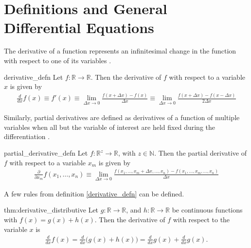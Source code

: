 
\section{Definitions and General Differential Equations}
 The derivative of a function represents an infinitesimal change in the function with respect to one of its variables \cite{bib:Wolfram}. 
\begin{defn}[Derivative]{derivative_defn} 
	Let $f:\mathbb{R}\rightarrow\mathbb{R}$. Then the derivative of $f$ with respect to a variable $x$ is given by
	\begin{align*}
	\frac{d}{dx}f(x)\equiv f'(x) \equiv\lim\limits_{\Delta x \rightarrow 0}\frac{f(x+\Delta x)-f(x)}{\Delta x} \equiv \lim\limits_{\Delta x \rightarrow 0}\frac{f(x+\Delta x)-f(x-\Delta x)}{2\Delta x}
	\end{align*}
\end{defn}
Similarly, partial derivatives are defined as derivatives of a function of multiple variables when all but the variable of interest are held fixed during the differentiation \cite{bib:Wolfram}. 
\begin{defn}{partial_derivative_defn}
	Let $f:\mathbb{R}^z\rightarrow\mathbb{R}$, with $z \in \mathbb{N}$. Then the partial derivative of $f$ with respect to a variable $x_m$ is given by
	\begin{align*}
	\frac{\partial}{\partial x_m}f(x_1,\dots,x_n) \equiv \lim\limits_{\Delta x \rightarrow 0}\frac{f(x_1,\dots,x_m+\Delta x, \dots,x_n)-f(x_1,\dots,x_m,\dots,x_n)}{\Delta x}
	\end{align*}
\end{defn}
A few rules from definition \ref{derivative_defn} can be defined.
\begin{theo}{thm:derivative_distributive}
	Let $g:\mathbb{R}\rightarrow\mathbb{R}$, and $h:\mathbb{R}\rightarrow\mathbb{R}$ be continuous functions with $f(x)=g(x)+h(x)$. Then the derivative of $f$ with respect to the variable $x$ is 
	\begin{align*}
	\frac{d}{dx}f(x)=\frac{d}{dx}\big(g(x)+h(x)\big) = \frac{d}{dx}g(x)+\frac{d}{dx}g(x).
	\end{align*} 
\end{theo}

